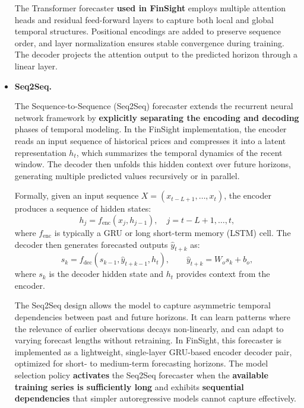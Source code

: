 \begin{itemize}
The Transformer forecaster \textbf{used in FinSight} employs multiple attention heads and residual feed-forward layers 
to capture both local and global temporal structures.  
Positional encodings are added to preserve sequence order, 
and layer normalization ensures stable convergence during training.  
The decoder projects the attention output to the predicted horizon through a linear layer.



  \item \textbf{Seq2Seq.}
  
  The Sequence-to-Sequence (Seq2Seq) forecaster extends the recurrent neural network framework by \textbf{explicitly separating the encoding and decoding} phases of temporal modeling.  
In the FinSight implementation, the encoder reads an input sequence of historical prices 
and compresses it into a latent representation \( h_t \), which summarizes the temporal dynamics of the recent window.  
The decoder then unfolds this hidden context over future horizons, generating multiple predicted values recursively or in parallel.

Formally, given an input sequence \( X = (x_{t-L+1}, \ldots, x_t) \), 
the encoder produces a sequence of hidden states:
\begin{equation}
h_j = f_{\mathrm{enc}}(x_j, h_{j-1}), \quad j = t-L+1, \ldots, t,
\end{equation}
where \( f_{\mathrm{enc}} \) is typically a \acf{GRU} or long short-term memory (LSTM) cell.  
The decoder then generates forecasted outputs \( \hat{y}_{t+k} \) as:
\begin{equation}
s_k = f_{\mathrm{dec}}(s_{k-1}, \hat{y}_{t+k-1}, h_t), \qquad
\hat{y}_{t+k} = W_o s_k + b_o,
\end{equation}
where \( s_k \) is the decoder hidden state and \( h_t \) provides context from the encoder.

The Seq2Seq design allows the model to capture asymmetric temporal dependencies between past and future horizons.  
It can learn patterns where the relevance of earlier observations decays non-linearly, and can adapt to varying forecast lengths without retraining.  
In FinSight, this forecaster is implemented as a lightweight, single-layer \acs{GRU}-based encoder decoder pair, optimized for short- to medium-term forecasting horizons.  
The model selection policy \textbf{activates} the Seq2Seq forecaster when the \textbf{available training series is sufficiently long} 
and exhibits \textbf{sequential dependencies} that simpler autoregressive models cannot capture effectively.
  


\end{itemize}
